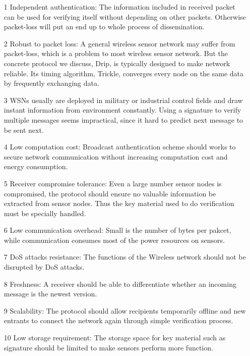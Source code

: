\documentclass{sig-alternate-05-2015}
\begin{document}
\begin{itemize}
\item[1] 
Independent authentication: The information included in received packet can be used for verifying itself without depending on other packets. Otherwise packet-loss will put an end up to whole process of dissemination.

\item[2] Robust to packet loss: A general wireless sensor network may suffer from packet-loss, which is a problem to most wireless sensor network. But the concrete protocol we discuss, Drip, is typically designed to make network reliable. Its timing algorithm, Trickle, converges every node on the same data by frequently exchanging data.

\item[3] WSNs usually are deployed in military or industrial control fields and draw instant information from environment constantly. 
Using a signature to verify multiple messages seems impractical, since it hard to predict next message to be sent next.

\item[4] Low computation cost: Broadcast authentication scheme should works to secure network communication without increasing computation cost and energy consumption. 

\item[5] Receiver compromise tolerance: Even a large number sensor nodes is compromised, the protocol should ensure no valuable information be  extracted from sensor nodes. Thus the key material used to do verification must be specially handled.

\item[6] Low communication overhead: Small is the number of bytes per pakcet, while communication consumes most of the power resources on sensors.

\item[7] DoS attacks resistance: The functions of the Wireless network should not be disrupted by DoS attacks.

\item[8] Freshness: A receiver should be able to differentiate whether an incoming message is the newest version.

\item[9] Scalability: The protocol should allow recipients temporarily offline and new entrants to connect the network again through  simple verification process.

\item[10] Low storage requirement: The storage space for key material such as signature should be limited to make sensors perform more function.
\end{itemize}
\end{document}
